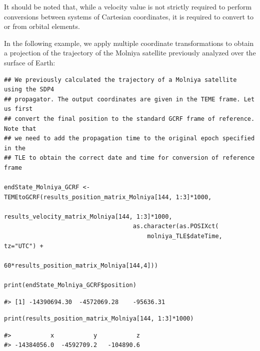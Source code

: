 It should be noted that, while a velocity value is not strictly required to perform conversions between systems of Cartesian coordinates, it is required to convert to or from orbital elements.

In the following example, we apply multiple coordinate transformations to obtain a projection of the trajectory of the Molniya satellite previously analyzed over the surface of Earth:

\begin{verbatim}
## We previously calculated the trajectory of a Molniya satellite using the SDP4
## propagator. The output coordinates are given in the TEME frame. Let us first
## convert the final position to the standard GCRF frame of reference. Note that
## we need to add the propagation time to the original epoch specified in the
## TLE to obtain the correct date and time for conversion of reference frame

endState_Molniya_GCRF <- TEMEtoGCRF(results_position_matrix_Molniya[144, 1:3]*1000,
                                    results_velocity_matrix_Molniya[144, 1:3]*1000,
                                    as.character(as.POSIXct(
                                        molniya_TLE$dateTime, tz="UTC") + 
                                            60*results_position_matrix_Molniya[144,4]))

print(endState_Molniya_GCRF$position)
\end{verbatim}

\begin{verbatim}
#> [1] -14390694.30  -4572069.28    -95636.31
\end{verbatim}

\begin{verbatim}
print(results_position_matrix_Molniya[144, 1:3]*1000)
\end{verbatim}

\begin{verbatim}
#>           x           y           z 
#> -14384056.0  -4592709.2   -104890.6
\end{verbatim}


